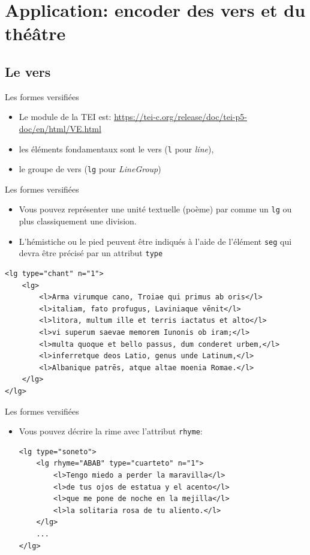 \documentclass[11pt,aspectratio=1610]{beamer}
\begin{document}
\section{Application: encoder des vers et du théâtre}

\subsection{Le vers}

\begin{frame}[containsverbatim]{Les formes versifiées}
\begin{itemize}
\item Le module de la TEI est: \href{Verse}{https://tei-c.org/release/doc/tei-p5-doc/en/html/VE.html}
\item les éléments fondamentaux sont le vers (\texttt{l} pour \textit{line}), 
\item le groupe de vers (\texttt{lg} pour \textit{LineGroup})
\end{itemize}
\end{frame}


\begin{frame}[containsverbatim]{Les formes versifiées}
\begin{itemize}
\item Vous pouvez représenter une unité textuelle (poème) par comme un \texttt{lg} ou plus classiquement une division. 
\item L'hémistiche ou le pied peuvent être indiqués à l'aide de l'élément \texttt{seg} qui devra être précisé par un attribut \texttt{type}
\end{itemize}
\begin{verbatim}
<lg type="chant" n="1">
    <lg>
        <l>Arma virumque cano, Troiae qui primus ab oris</l>
        <l>italiam, fato profugus, Laviniaque vēnit</l>
        <l>litora, multum ille et terris iactatus et alto</l>
        <l>vi superum saevae memorem Iunonis ob iram;</l>
        <l>multa quoque et bello passus, dum conderet urbem,</l>
        <l>inferretque deos Latio, genus unde Latinum,</l>
        <l>Albanique patrēs, atque altae moenia Romae.</l>
    </lg>
</lg>
\end{verbatim}
\end{frame}

\begin{frame}[containsverbatim]{Les formes versifiées}
\begin{itemize}
\item Vous pouvez décrire la rime avec l'attribut \texttt{rhyme}:


\begin{verbatim}
<lg type="soneto">
    <lg rhyme="ABAB" type="cuarteto" n="1">
        <l>Tengo miedo a perder la maravilla</l>
        <l>de tus ojos de estatua y el acento</l>
        <l>que me pone de noche en la mejilla</l>
        <l>la solitaria rosa de tu aliento.</l>
    </lg>
    ...
</lg>
\end{verbatim}
\end{itemize}
\end{frame}
\end{document}
